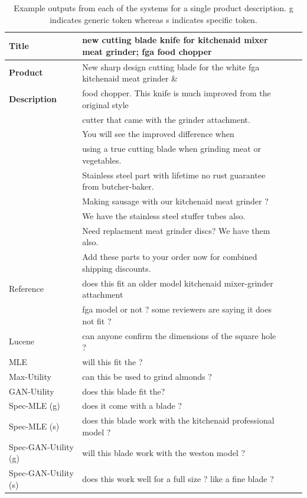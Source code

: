\documentclass[11pt,a4paper]{article}
\begin{document}
\begin{table}[t]
\begin{tabular}{l l c c}
 \toprule
  \textbf{Title} & new cutting blade knife for kitchenaid mixer meat grinder; fga food chopper    \\
\midrule
\textbf{Product} &  New sharp design cutting blade for the white fga kitchenaid meat grinder \& \\
\textbf{Description} &  food chopper. This knife is much improved from the original style \\
 &cutter that came with the grinder attachment. \\
 &You will see the improved difference when \\
& using a true cutting blade when grinding meat or vegetables.  \\
& Stainless steel part with lifetime no rust guarantee from butcher-baker. \\
& Making sausage with our kitchenaid meat grinder ? \\
& We have the stainless steel stuffer tubes also. \\
& Need replacment meat grinder discs? We have them also. \\
&  Add these parts to your order now for combined shipping discounts. \\
\midrule
Reference & does this fit an older model kitchenaid mixer-grinder attachment \\
& fga model or not ? some reviewers are saying it does not fit ?\\
Lucene & can anyone confirm the dimensions of the square hole ? \\
MLE & will this fit the ?\\
Max-Utility & can this be used to grind almonds ?  \\
GAN-Utility & does this blade fit the?\\
Spec-MLE (g) & does it come with a blade ? \\
Spec-MLE (s) & does this blade work with the kitchenaid professional model ?\\
Spec-GAN-Utility (g) &  will this blade work with the weston model ?\\
Spec-GAN-Utility (s) & does this work well for a full size ? like a fine blade ? \\
\bottomrule

\end{tabular}
\caption{Example outputs from each of the systems for a single product description. g indicates generic token whereas s indicates specific token.}\label{tab:spec-example-outputs}
\end{table}




%
%
\end{document}
